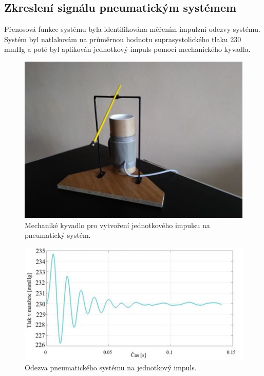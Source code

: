 \subsection{Zkreslení signálu pneumatickým systémem}
Přenosová funkce systému byla identifikována měřením impulzní odezvy systému. Systém byl natlakovám na průměrnou hodnotu suprasystolického tlaku 230 mmHg a poté
byl aplikován jednotkový impuls pomocí mechanického kyvadla. \cite{cite:Patricia}
\begin{figure}[H]
    \label{fig:mech_kyvadlo}
    \includegraphics[width=1\textwidth]{pictures/mech_kyvadlo.jpg}
    \caption{Mechaniké kyvadlo pro vytvoření jednotkového impulsu na pneumatický systém. \cite{cite:Patricia}}
\end{figure}
\begin{figure}[H]
    \label{fig:pneu_impulse_response}
    \includegraphics[width=1\textwidth]{pictures/pneu_impulse.jpg}
    \caption{Odezva pneumatického systému na jednotkový impuls. \cite{cite:Patricia}}
\end{figure}
